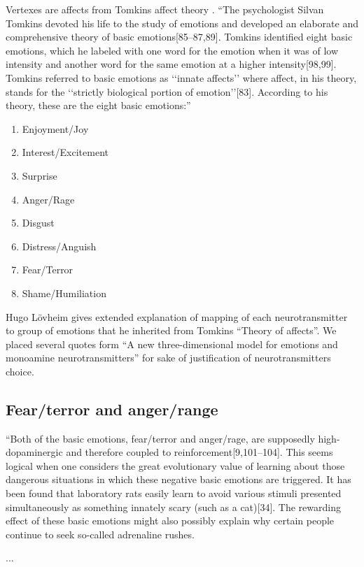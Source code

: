 Vertexes are affects from Tomkins affect theory \cite{primer_affect_psychology}. ``The psychologist Silvan Tomkins devoted his life to the study of emotions and developed an elaborate and comprehensive theory of basic emotions[85–87,89]. Tomkins identified eight basic emotions, which he labeled with one word for the emotion when it was of low intensity and another word for the same emotion at a higher intensity[98,99]. Tomkins referred to basic emotions as ‘‘innate affects’’ where affect, in his theory, stands for the ‘‘strictly biological portion of emotion’’[83]. According to his theory, these are the eight basic emotions:''

\begin{enumerate}
 \item  Enjoyment/Joy
 \item  Interest/Excitement
 \item  Surprise
 \item  Anger/Rage
 \item  Disgust
 \item  Distress/Anguish
 \item  Fear/Terror
 \item  Shame/Humiliation
\end{enumerate}

Hugo L\"{o}vheim gives extended explanation of mapping of each neurotransmitter to group of emotions that he inherited from Tomkins ``Theory of affects''. We placed several quotes form ``A new three-dimensional model for emotions and monoamine neurotransmitters'' \cite{cubeofemotions} for sake of justification of neurotransmitters choice.


\subsection{Fear/terror and anger/range}

``Both of the basic emotions, fear/terror and anger/rage, are supposedly high-dopaminergic and therefore coupled to reinforcement[9,101–104]. This seems logical when one considers the great evolutionary value of learning about those dangerous situations in which these negative basic emotions are triggered. It has been found that laboratory rats easily learn to avoid various stimuli presented simultaneously as something innately scary (such as a cat)[34]. The rewarding effect of these basic emotions might also possibly explain why certain people continue to seek so-called adrenaline rushes. 

... 


